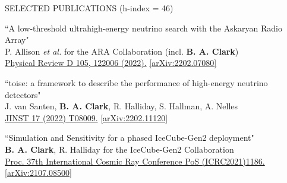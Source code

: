 \documentclass{resume} %
\begin{document}
\begin{rSection}{SELECTED PUBLICATIONS (h-index = 46)}
\begin{etaremune}


  \item ``A low-threshold ultrahigh-energy neutrino search with the Askaryan Radio Array" \\
 P. Allison {\it et al.} for the ARA Collaboration (incl. \textbf{B. A. Clark})\\ \href{https://doi.org/10.1103/PhysRevD.105.122006}{Physical Review D 105, 122006 (2022).}  \href{https://arxiv.org/abs/2202.07080}{[arXiv:2202.07080]}


  \item ``toise: a framework to describe the performance of high-energy neutrino detectors" \\
 J. van Santen, \textbf{B. A. Clark}, R. Halliday, S. Hallman, A. Nelles \\  \href{https://doi.org/10.1088/1748-0221/17/08/T08009}{JINST 17 (2022) T08009.}  \href{https://arxiv.org/abs/2202.11120}{[arXiv:2202.11120]}


  \item ``Simulation and Sensitivity for a phased IceCube-Gen2 deployment" \\
 \textbf{B. A. Clark}, R. Halliday for the IceCube-Gen2 Collaboration \\ \href{https://doi.org/10.22323/1.395.1186}{Proc. 37th International Cosmic Ray Conference PoS (ICRC2021)1186.}  \href{https://arxiv.org/abs/2107.08500}{[arXiv:2107.08500]}
 


\end{etaremune}
\end{rSection}
\end{document}
